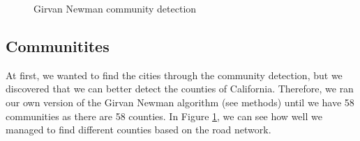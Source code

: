 \documentclass[11pt]{article}
\begin{document}
\begin{figure}[h]
    \caption{Girvan Newman community detection}
\label{fig:com}
\centering
 \qquad
\end{figure}


\subsection{Communitites}
At first, we wanted to find the cities through the community detection, but we discovered that we can better detect the counties of California. Therefore, we ran our own version of the Girvan Newman algorithm (see methods) until we have 58 communities as there are 58 counties. 
In Figure \ref{fig:com}, we can see how well we managed to find different counties based on the road network. 

\newpage
\end{document}
